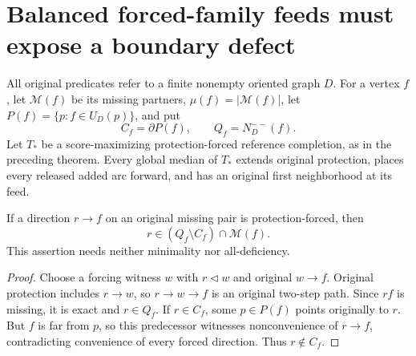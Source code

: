 \section{Balanced forced-family feeds must expose a boundary defect}
\label{sec:forced-feed-boundary-obstruction}

All original predicates refer to a finite nonempty oriented graph $D$.
For a vertex $f$, let $\mathcal M(f)$ be its missing partners,
$\mu(f)=|\mathcal M(f)|$, let $P(f)=\{p:f\in U_D(p)\}$,
and put
\[
 C_f=\partial P(f),\qquad Q_f=N_D^{--}(f).
\]
Let $T_*$ be a score-maximizing protection-forced reference completion,
as in the preceding theorem. Every global median of $T_*$
extends original protection, places every released added arc forward,
and has an original first neighborhood at its feed.

\begin{lemma}
\label{lem:forced-incoming-boundary-defect}
If a direction $r\to f$ on an original missing pair is
protection-forced, then
\[
 r\in (Q_f\setminus C_f)\cap\mathcal M(f).
\]
This assertion needs neither minimality nor all-deficiency.
\end{lemma}
\begin{proof}
Choose a forcing witness $w$ with $r\triangleleft w$ and original
$w\to f$. Original protection includes $r\to w$, so
$r\to w\to f$ is an original two-step path. Since $rf$ is missing,
it is exact and $r\in Q_f$. If $r\in C_f$, some $p\in P(f)$
points originally to $r$. But $f$ is far from $p$, so this predecessor
witnesses nonconvenience of $r\to f$, contradicting convenience of
every forced direction. Thus $r\notin C_f$.
\end{proof}

